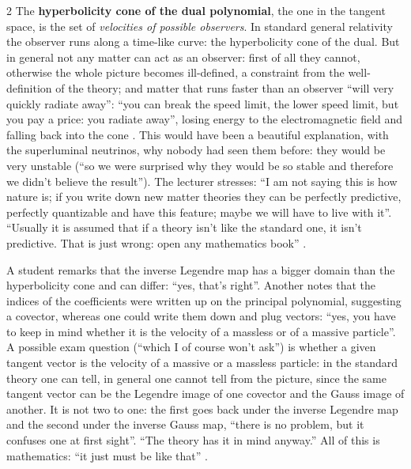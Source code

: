 \begin{paracol}{2}
The \textbf{hyperbolicity cone of the dual polynomial}, the one in the tangent space, is the set of \emph{velocities of possible observers}. In standard general relativity the observer runs along a time-like curve: the hyperbolicity cone of the dual. But in general not any matter can act as an observer: first of all they cannot, otherwise the whole picture becomes ill-defined, a constraint from the well-definition of the theory; and matter that runs faster than an observer ``will very quickly radiate away'': ``you can break the speed limit, the lower speed limit, but you pay a price: you radiate away'', losing energy to the electromagnetic field and falling back into the cone . This would have been a beautiful explanation, with the superluminal neutrinos, why nobody had seen them before: they would be very unstable (``so we were surprised why they would be so stable and therefore we didn't believe the result''). The lecturer stresses: ``I am not saying this is how nature is; if you write down new matter theories they can be perfectly predictive, perfectly quantizable and have this feature; maybe we will have to live with it''. ``Usually it is assumed that if a theory isn't like the standard one, it isn't predictive. That is just wrong: open any mathematics book'' .

\begin{coursenote}
A student remarks that the inverse Legendre map has a bigger domain than the hyperbolicity cone and can differ: ``yes, that's right''. Another notes that the indices of the coefficients were written up on the principal polynomial, suggesting a covector, whereas one could write them down and plug vectors: ``yes, you have to keep in mind whether it is the velocity of a massless or of a massive particle''. A possible exam question (``which I of course won't ask'') is whether a given tangent vector is the velocity of a massive or a massless particle: in the standard theory one can tell, in general one cannot tell from the picture, since the same tangent vector can be the Legendre image of one covector and the Gauss image of another. It is not two to one: the first goes back under the inverse Legendre map and the second under the inverse Gauss map, ``there is no problem, but it confuses one at first sight''. ``The theory has it in mind anyway.'' All of this is mathematics: ``it just must be like that'' .
\end{coursenote}


\end{paracol}
